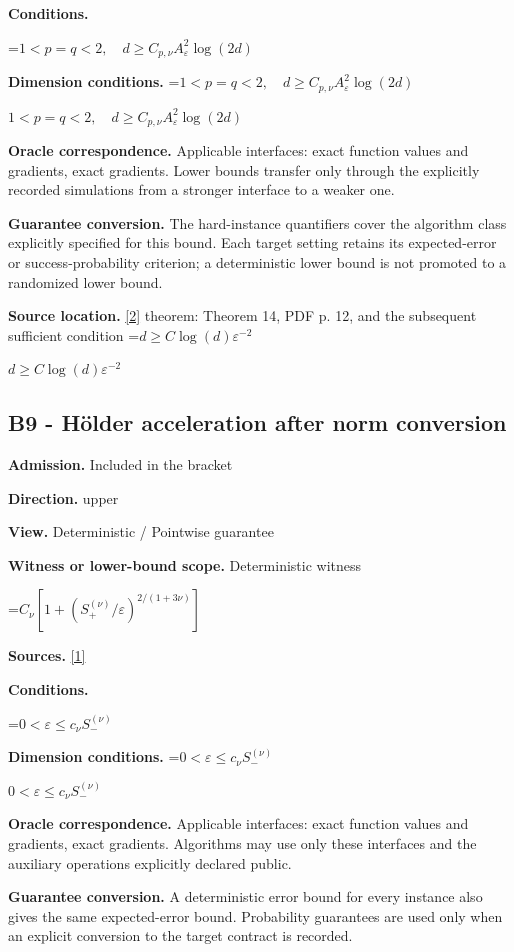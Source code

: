 \documentclass[10pt,a4paper]{article}
\newcommand{\AtlasMath}[1]{\par\begingroup\centering\setbox0=\hbox{$\displaystyle #1$}\ifdim\wd0>1.4\linewidth\typeout{ATLAS WIDE FORMULA: \the\wd0}\fi\ifdim\wd0>\linewidth\resizebox{\linewidth}{!}{\box0}\else\box0\fi\par\endgroup}
\newcommand{\AtlasInlineMath}[1]{\begingroup\setbox0=\hbox{$#1$}\ifdim\wd0>.4\linewidth\endgroup\AtlasMath{#1}\else\endgroup$#1$\fi}
\begin{document}
\textbf{Conditions.} 
\AtlasMath{1<p=q<2,\quad d\ge C_{p,\nu} A_\varepsilon^2\log(2d)}


\textbf{Dimension conditions.} \AtlasInlineMath{1<p=q<2,\quad d\ge C_{p,\nu} A_\varepsilon^2\log(2d)}

\textbf{Oracle correspondence.} Applicable interfaces: exact function values and gradients, exact gradients. Lower bounds transfer only through the explicitly recorded simulations from a stronger interface to a weaker one.

\textbf{Guarantee conversion.} The hard-instance quantifiers cover the algorithm class explicitly specified for this bound. Each target setting retains its expected-error or success-probability criterion; a deterministic lower bound is not promoted to a randomized lower bound.

\textbf{Source location.} \href{https://proceedings.mlr.press/v99/diakonikolas19c/diakonikolas19c.pdf}{[2]} theorem: Theorem 14, PDF p. 12, and the subsequent sufficient condition \AtlasInlineMath{d\ge C\log(d)\varepsilon^{-2}}

\subsection{B9 - Hölder acceleration after norm conversion}
\textbf{Admission.} Included in the bracket

\textbf{Direction.} upper

\textbf{View.} Deterministic / Pointwise guarantee

\textbf{Witness or lower-bound scope.} Deterministic witness

\AtlasMath{C_\nu[1+(S_+^{(\nu)}/\varepsilon)^{2/(1+3\nu)}]}
\textbf{Sources.} \href{https://optimization-online.org/wp-content/uploads/2010/12/2865.pdf}{[1]}

\textbf{Conditions.} 
\AtlasMath{0<\varepsilon\le c_\nu S_-^{(\nu)}}


\textbf{Dimension conditions.} \AtlasInlineMath{0<\varepsilon\le c_\nu S_-^{(\nu)}}

\textbf{Oracle correspondence.} Applicable interfaces: exact function values and gradients, exact gradients. Algorithms may use only these interfaces and the auxiliary operations explicitly declared public.

\textbf{Guarantee conversion.} A deterministic error bound for every instance also gives the same expected-error bound. Probability guarantees are used only when an explicit conversion to the target contract is recorded.
\end{document}
